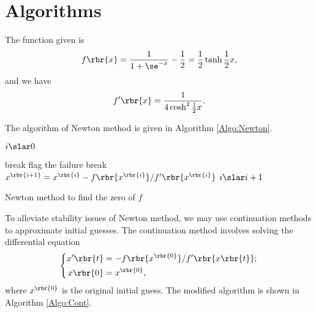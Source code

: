 \documentclass[english, nochinese]{pkupaper}
\title{\titlemark}
\author{\authoring}
\date{June 19, 2018}
\begin{document}
\maketitle

\section{Algorithms}

The function given is
\begin{equation}
f \rbr{x} = \frac{1}{ 1 + \se^{-x} } - \frac{1}{2} = \frac{1}{2} \tanh \frac{1}{2} x,
\end{equation}
and we have
\begin{equation}
f' \rbr{x} = \frac{1}{ 4 \cosh^2 \frac{1}{2} x }.
\end{equation}

The algorithm of Newton method is given in Algorithm \ref{Algo:Newton}.

\begin{algorithm}
\SetAlgoLined


\BlankLine

$ i \slar 0 $\;

{
    {
        break\;
    }
    {
        flag the failure\;
        break\;
    }
    $ x^{\rbr{ i + 1 }} = x^{\rbr{i}} - f \rbr{x^{\rbr{i}}} / f' \rbr{x^{\rbr{i}}} $\;
    $ i \slar i + 1 $\;
}


\BlankLine

\caption{Newton method to find the zero of $f$}
\label{Algo:Newton}
\end{algorithm}

To alleviate stability issues of Newton method, we may use continuation methods to approximate initial guesses. The continuation method involves solving the differential equation
\begin{equation} \label{Eq:Diff}
\left\{
\begin{aligned}
x' \rbr{t} &= -f \rbr{x^{\rbr{0}}} / f' \rbr{ x \rbr{t} }; \\
x \rbr{0} &= x^{\rbr{0}},
\end{aligned}
\right.
\end{equation}
where $x^{\rbr{0}}$ is the original initial guess. The modified algorithm is shown in Algorithm \ref{Algo:Cont}.
\end{document}
